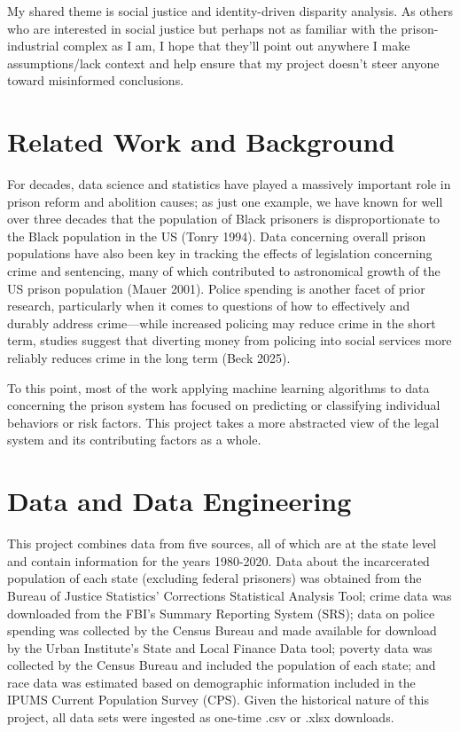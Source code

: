 \documentclass[
  letterpaper,
  DIV=11,
  numbers=noendperiod]{scrartcl}
\begin{document}
My shared theme is social justice and identity-driven disparity
analysis. As others who are interested in social justice but perhaps not
as familiar with the prison-industrial complex as I am, I hope that
they'll point out anywhere I make assumptions/lack context and help
ensure that my project doesn't steer anyone toward misinformed
conclusions.

\section{Related Work and Background}\label{related-work-and-background}

For decades, data science and statistics have played a massively
important role in prison reform and abolition causes; as just one
example, we have known for well over three decades that the population
of Black prisoners is disproportionate to the Black population in the US
(Tonry 1994). Data concerning overall prison populations have also been
key in tracking the effects of legislation concerning crime and
sentencing, many of which contributed to astronomical growth of the US
prison population (Mauer 2001). Police spending is another facet of
prior research, particularly when it comes to questions of how to
effectively and durably address crime---while increased policing may
reduce crime in the short term, studies suggest that diverting money
from policing into social services more reliably reduces crime in the
long term (Beck 2025).

To this point, most of the work applying machine learning algorithms to
data concerning the prison system has focused on predicting or
classifying individual behaviors or risk factors. This project takes a
more abstracted view of the legal system and its contributing factors as
a whole.

\section{Data and Data Engineering}\label{data-and-data-engineering}

This project combines data from five sources, all of which are at the
state level and contain information for the years 1980-2020. Data about
the incarcerated population of each state (excluding federal prisoners)
was obtained from the Bureau of Justice Statistics' Corrections
Statistical Analysis Tool; crime data was downloaded from the FBI's
Summary Reporting System (SRS); data on police spending was collected by
the Census Bureau and made available for download by the Urban
Institute's State and Local Finance Data tool; poverty data was
collected by the Census Bureau and included the population of each
state; and race data was estimated based on demographic information
included in the IPUMS Current Population Survey (CPS). Given the
historical nature of this project, all data sets were ingested as
one-time .csv or .xlsx downloads.
\end{document}
